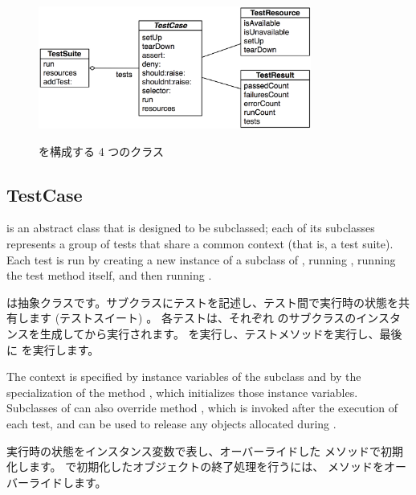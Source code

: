 \documentclass[a4paper,10pt,twoside]{book}
\begin{document}
\begin{figure}[htb]
  \begin{center}
		{\includegraphics[width=0.8\textwidth]{sunit-classes}}
	\caption{\SUnit を構成する 4 つのクラス}
  \end{center}
\end{figure}


\subsection{TestCase}

 is an abstract class that is designed to be subclassed; each of its subclasses represents a group of tests that share a common context (that is, a test suite).
Each test is run by creating a new instance of a subclass of ,
running , running the test method itself, and then running .
\fi

 は抽象クラスです。サブクラスにテストを記述し、テスト間で実行時の状態を共有します (テストスイート) 。
各テストは、それぞれ  のサブクラスのインスタンスを生成してから実行されます。  を実行し、テストメソッドを実行し、最後に  を実行します。

The context is specified
by instance variables of the subclass
and by the specialization of the method
, which initializes those instance variables.
Subclasses of  can also override method
, which is invoked after the execution of each test,
and can be used to release any objects
allocated during .
\fi

実行時の状態をインスタンス変数で表し、オーバーライドした  メソッドで初期化します。  で初期化したオブジェクトの終了処理を行うには、  メソッドをオーバーライドします。
\end{document}
